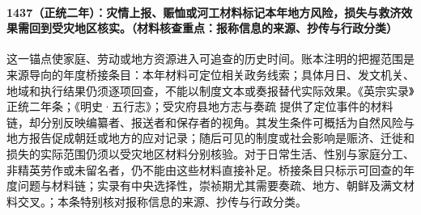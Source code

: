\paragraph{1437（正统二年）：灾情上报、赈恤或河工材料标记本年地方风险，损失与救济效果需回到受灾地区核实。（材料核查重点：报称信息的来源、抄传与行政分类）} 这一锚点使家庭、劳动或地方资源进入可追查的历史时间。账本注明的把握范围是来源导向的年度桥接条目：本年材料可定位相关政务线索；具体月日、发文机关、地域和执行结果仍须逐项回查，不能以制度文本或奏报替代实际效果。《英宗实录》正统二年条；《明史·五行志》；受灾府县地方志与奏疏 提供了定位事件的材料链，却分别反映编纂者、报送者和保存者的视角。其发生条件可概括为自然风险与地方报告促成朝廷或地方的应对记录；随后可见的制度或社会影响是赈济、迁徙和损失的实际范围仍须以受灾地区材料分别核验。对于日常生活、性别与家庭分工、非精英劳作或未留名者，仍不能由这些材料直接补足。桥接条目只标示可回查的年度问题与材料链；实录有中央选择性，崇祯期尤其需要奏疏、地方、朝鲜及满文材料交叉。；本条特别核对报称信息的来源、抄传与行政分类。
